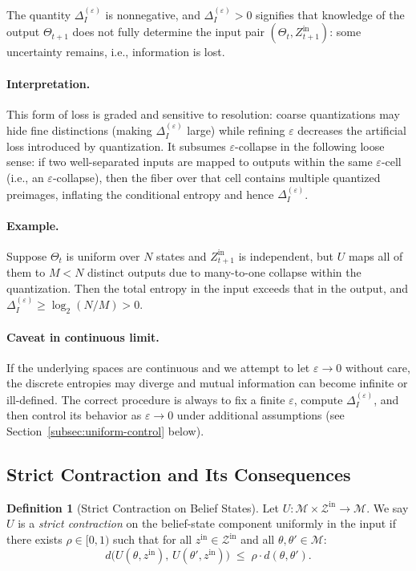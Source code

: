 \documentclass[12pt]{article}
\theoremstyle{definition}
\newtheorem{definition}{Definition}[section]
\theoremstyle{plain}
\begin{document}
The quantity \(\Delta_I^{(\varepsilon)}\) is nonnegative, and \(\Delta_I^{(\varepsilon)}>0\) signifies that knowledge of the output \(\Theta_{t+1}\) does not fully determine the input pair \((\Theta_t, Z^{\mathrm{in}}_{t+1})\): some uncertainty remains, i.e., information is lost.

\paragraph{Interpretation.} This form of loss is graded and sensitive to resolution: coarse quantizations may hide fine distinctions (making \(\Delta_I^{(\varepsilon)}\) large) while refining \(\varepsilon\) decreases the artificial loss introduced by quantization.  It subsumes \(\varepsilon\)-collapse in the following loose sense: if two well-separated inputs are mapped to outputs within the same \(\varepsilon\)-cell (i.e., an \(\varepsilon\)-collapse), then the fiber over that cell contains multiple quantized preimages, inflating the conditional entropy and hence \(\Delta_I^{(\varepsilon)}\).

\paragraph{Example.} Suppose \(\Theta_t\) is uniform over \(N\) states and \(Z^{\mathrm{in}}_{t+1}\) is independent, but \(U\) maps all of them to \(M < N\) distinct outputs due to many-to-one collapse within the quantization. Then the total entropy in the input exceeds that in the output, and \(\Delta_I^{(\varepsilon)} \ge \log_2(N/M) > 0\).

\paragraph{Caveat in continuous limit.} If the underlying spaces are continuous and we attempt to let \(\varepsilon \to 0\) without care, the discrete entropies may diverge and mutual information can become infinite or ill-defined.  The correct procedure is always to fix a finite \(\varepsilon\), compute \(\Delta_I^{(\varepsilon)}\), and then control its behavior as \(\varepsilon\to0\) under additional assumptions (see Section~\ref{subsec:uniform-control} below).  

\subsection{Strict Contraction and Its Consequences}

\begin{definition}[Strict Contraction on Belief States]
Let \(U: \mathcal{M}\times\mathcal{Z}^{\mathrm{in}}\to\mathcal{M}\).  We say \(U\) is a \emph{strict contraction} on the belief-state component uniformly in the input if there exists \(\rho\in[0,1)\) such that for all \(z^{\mathrm{in}}\in\mathcal{Z}^{\mathrm{in}}\) and all \(\theta, \theta'\in\mathcal{M}\):
\[
d\bigl(U(\theta,z^{\mathrm{in}}),\, U(\theta',z^{\mathrm{in}})\bigr)
\;\le\; \rho\cdot d(\theta,\theta').
\]
\end{definition}
\end{document}
